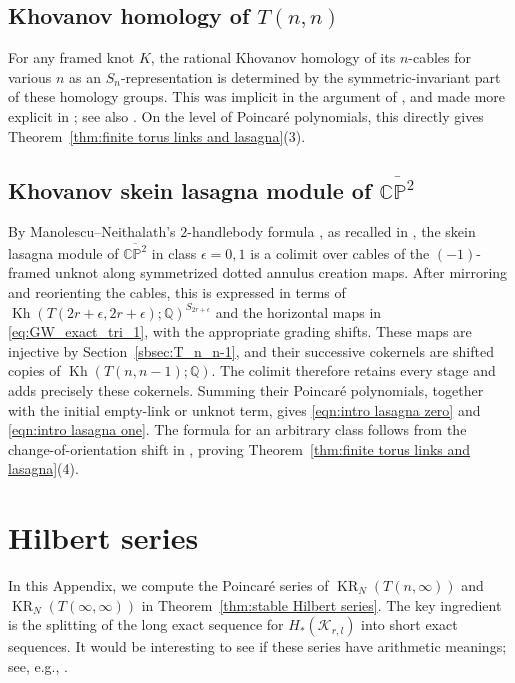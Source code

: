 \documentclass[reqno]{amsart}
\theoremstyle{definition}
\theoremstyle{remark}
\newcommand{\QQ}{\mathbb{Q}}
\newcommand{\CP}{\mathbb{CP}}
\newcommand{\cak}{\mathcal{K}}
\DeclareMathOperator{\KR}{KR}
\DeclareMathOperator{\Kh}{Kh}
\begin{document}
\subsection{Khovanov homology of \texorpdfstring{$T(n,n)$}{T(n,n)}}
For any framed knot $K$, the rational Khovanov homology of its $n$-cables for various $n$ as an $S_n$-representation is determined by the symmetric-invariant part of these homology groups. This was implicit in the argument of \cite[Section~4.3]{ren2024lee}, and made more explicit in \cite[Proposition~1.4.3]{ren2026khovanov}; see also \cite[Theorem~1.1]{ritter2025computing}. On the level of Poincar\'e polynomials, this directly gives Theorem~\ref{thm:finite torus links and lasagna}(3).

\subsection{Khovanov skein lasagna module of \texorpdfstring{$\overline{\CP^2}$}{-CP2}}
By Manolescu--Neithalath's $2$-handlebody formula \cite[Theorem~1.1]{manolescu2022skein}, as recalled in \cite[Equations~(15) and~(28)]{ren2024khovanov}, the skein lasagna module of $\overline{\CP^2}$ in class $\epsilon=0,1$ is a colimit over cables of the $(-1)$-framed unknot along symmetrized dotted annulus creation maps. After mirroring and reorienting the cables, this is expressed in terms of $\Kh(T(2r+\epsilon,2r+\epsilon);\QQ)^{S_{2r+\epsilon}}$ and the horizontal maps in \eqref{eq:GW_exact_tri_1}, with the appropriate grading shifts. These maps are injective by Section~\ref{sbsec:T_n_n-1}, and their successive cokernels are shifted copies of $\Kh(T(n,n-1);\QQ)$. The colimit therefore retains every stage and adds precisely these cokernels. Summing their Poincar\'e polynomials, together with the initial empty-link or unknot term, gives \eqref{eqn:intro lasagna zero} and \eqref{eqn:intro lasagna one}. The formula for an arbitrary class follows from the change-of-orientation shift in \cite[Equation~(16)]{ren2024khovanov}, proving Theorem~\ref{thm:finite torus links and lasagna}(4).

\appendix

\section{Hilbert series}\label{app:Hilbert series}

In this Appendix, we compute the Poincar\'e series of $\KR_N(T(n,\infty))$ and $\KR_N(T(\infty,\infty))$ in Theorem~\ref{thm:stable Hilbert series}. The key ingredient is the splitting of the long exact sequence for $H_*(\cak_{r,l})$ into short exact sequences. It would be interesting to see if these series have arithmetic meanings; see, e.g., \cite{habiro2004cyclotomic,nahm2007conformal,zagier2007dilogarithm,zagier2010quantum}.
\end{document}
